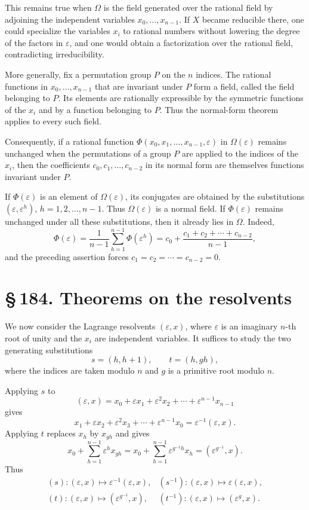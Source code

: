 \documentclass[11pt]{article}
\newcommand{\sect}[2]{\section*{\S\,#1. #2}}
\newcommand{\eps}{\varepsilon}
\newcommand{\Om}{\Omega}
\begin{document}
This remains true when $\Om$ is the field generated over the rational field by adjoining the independent variables $x_0,\ldots,x_{n-1}$. If $X$ became reducible there, one could specialize the variables $x_i$ to rational numbers without lowering the degree of the factors in $\eps$, and one would obtain a factorization over the rational field, contradicting irreducibility.

More generally, fix a permutation group $P$ on the $n$ indices. The rational functions in $x_0,
\ldots,x_{n-1}$ that are invariant under $P$ form a field, called the field belonging to $P$. Its elements are rationally expressible by the symmetric functions of the $x_i$ and by a function belonging to $P$. Thus the normal-form theorem applies to every such field.

Consequently, if a rational function $\Phi(x_0,x_1,\ldots,x_{n-1},\eps)$ in $\Om(\eps)$ remains unchanged when the permutations of a group $P$ are applied to the indices of the $x_i$, then the coefficients $c_0,c_1,\ldots,c_{n-2}$ in its normal form are themselves functions invariant under $P$.

If $\Phi(\eps)$ is an element of $\Om(\eps)$, its conjugates are obtained by the substitutions $(\eps,\eps^h)$, $h=1,2,\ldots,n-1$. Thus $\Om(\eps)$ is a normal field. If $\Phi(\eps)$ remains unchanged under all these substitutions, then it already lies in $\Om$. Indeed,
\[
  \Phi(\eps)=\frac1{n-1}\sum_{h=1}^{n-1}\Phi(\eps^h)
  =c_0+\frac{c_1+c_2+\cdots+c_{n-2}}{n-1},
\]
and the preceding assertion forces $c_1=c_2=\cdots=c_{n-2}=0$.

\sect{184}{Theorems on the resolvents}

We now consider the Lagrange resolvents $(\eps,x)$, where $\eps$ is an imaginary $n$-th root of unity and the $x_i$ are independent variables. It suffices to study the two generating substitutions
\begin{equation}
  s=(h,h+1),\qquad t=(h,gh),
\end{equation}
where the indices are taken modulo $n$ and $g$ is a primitive root modulo $n$.

Applying $s$ to
\begin{equation}
  (\eps,x)=x_0+\eps x_1+\eps^2x_2+\cdots+\eps^{n-1}x_{n-1}
\end{equation}
gives
\[
  x_1+\eps x_2+\eps^2x_3+\cdots+\eps^{n-1}x_0=\eps^{-1}(\eps,x).
\]
Applying $t$ replaces $x_h$ by $x_{gh}$ and gives
\begin{equation}
  x_0+\sum_{h=1}^{n-1}\eps^h x_{gh}
  =x_0+\sum_{h=1}^{n-1}\eps^{g^{-1}h}x_h=(\eps^{g^{-1}},x).
\end{equation}
Thus
\[
\begin{array}{ll}
(s): (\eps,x)\mapsto \eps^{-1}(\eps,x),&
(s^{-1}): (\eps,x)\mapsto \eps(\eps,x),\\[0.2em]
(t): (\eps,x)\mapsto (\eps^{g^{-1}},x),&
(t^{-1}): (\eps,x)\mapsto (\eps^g,x).
\end{array}
\]
\end{document}
